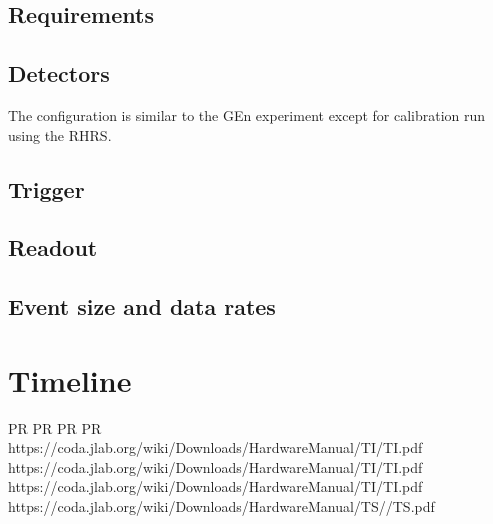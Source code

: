 \documentclass{article}
\begin{document}
\subsection{Requirements}
\subsection{Detectors}
The configuration is similar to the GEn experiment except for calibration run using the RHRS.

\subsection{Trigger}

\subsection{Readout}

\subsection{Event size and data rates}


\section{Timeline}

\begin{thebibliography}{9}
 PR
 PR
 PR
 PR
 https://coda.jlab.org/wiki/Downloads/HardwareManual/TI/TI.pdf
 https://coda.jlab.org/wiki/Downloads/HardwareManual/TI/TI.pdf
 https://coda.jlab.org/wiki/Downloads/HardwareManual/TI/TI.pdf
 https://coda.jlab.org/wiki/Downloads/HardwareManual/TS//TS.pdf
\end{thebibliography}
\end{document}

